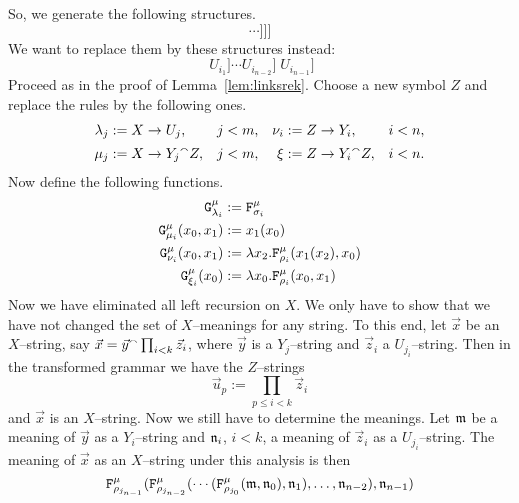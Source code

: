 So, we generate the following structures.
\begin{equation}
[Y' \; [U_{i_0}\; [U_{i_1}\dotsb [U_{i_{n-2}}\; U_{i_{n-1}}]\dotsb]]]
\end{equation}
We want to replace them by these structures instead:
\begin{equation}
[[\dotsb[[Y'\; U_{i_0}] \; U_{i_1}]\dotsb U_{i_{n-2}}]\;
U_{i_{n-1}}]
\end{equation}
Proceed as in the proof of Lemma~\ref{lem:linksrek}. Choose a new
symbol $Z$ and replace the rules by the following ones.
\begin{subequations}
\begin{align}
\lambda_j & := X \rightarrow U_j, & j < m, &&
\nu_i & := Z \rightarrow Y_i, & i < n, \\
\mu_j & := X \rightarrow Y_j {^{\smallfrown}} Z, & j < m, &&
\xi   & := Z \rightarrow Y_i {^{\smallfrown}} Z, & i < n.
\end{align}
\end{subequations}
Now define the following functions.
\begin{align}
\begin{split}
\mbox{\tt G}^{\mu}_{\lambda_i} & := \mbox{\tt F}^{\mu}_{\sigma_i} \\
\mbox{\tt G}^{\mu}_{\mu_i}(x_0,x_1) & := x_1(x_0) \\
\mbox{\tt G}^{\mu}_{\nu_i}(x_0,x_1) & :=
    \lambda x_2.\mbox{\tt F}^{\mu}_{\rho_i}(x_1(x_2), x_0)
    \\
\mbox{\tt G}^{\mu}_{\xi_i}(x_0) & :=
    \lambda x_0.\mbox{\tt F}^{\mu}_{\rho_i}(x_0, x_1)
\end{split}
\end{align}
Now we have eliminated all left recursion on $X$. We only have to 
show that we have not changed the set of $X$--meanings for any 
string. To this end, let $\vec{x}$ be an $X$--string, say 
$\vec{x} = \vec{y} {^{\smallfrown}} \prod_{i < k} \vec{z}_i$, where $\vec{y}$ 
is a $Y_j$--string and $\vec{z}_i$ a $U_{j_i}$--string. Then in the 
transformed grammar we have the $Z$--strings
\begin{equation}
\vec{u}_p := \prod_{p \leq i < k} \vec{z}_i
\end{equation}
and $\vec{x}$ is an $X$--string. Now we still have to determine
the meanings. Let $\mathfrak{m}$ be a meaning of $\vec{y}$ as a
$Y_i$--string and $\mathfrak{n}_i$, $i < k$, a meaning of $\vec{z}_i$ as
a $U_{j_i}$--string. The meaning of $\vec{x}$ as an $X$--string
under this analysis is then
\begin{equation}
\mbox{\tt F}^{\mu}_{\rho_{j_{n-1}}}(%
    \mbox{\tt F}^{\mu}_{\rho_{j_{n-2}}}(\dotsb (%
    \mbox{\tt F}^{\mu}_{\rho_{j_0}}(\Gm,\Gn_0),\Gn_1),
    \dotsc,\Gn_{n-2}),\Gn_{n-1})
\end{equation}
